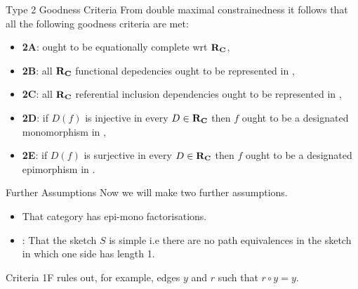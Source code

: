 \begin{frame}{Type 2 Goodness Criteria}{\slidecontext}
From double maximal constrainedness it follows that all the following goodness criteria are met: 
\begin{itemize}
\item \textbf{2A}:  \catcw ought to be equationally complete wrt $\textbf{R}_{\textbf{C}}$,         
\item \textbf{2B}:  all $\textbf{R}_{\textbf{C}}$ functional depedencies ought to be represented in \catc,
\item \textbf{2C}:  all $\textbf{R}_{\textbf{C}}$ referential inclusion dependencies ought to be represented in \catc, 
\pause \item \textbf{2D}:  if $D(f)$ is injective in every $D \in \textbf{R}_{\textbf{C}}$ then $f$ ought to be a designated monomorphism in \catc,
\pause \item \textbf{2E}:  if $D(f)$ is surjective in every $D \in \textbf{R}_{\textbf{C}}$ then $f$ ought to be a designated epimorphism in \catc.
\end{itemize}
\iffalse
We can also show that \textbf{2B} can be weakened. If all functional dependencies \textbf{upon edges} from sketch $S$ are represented then all functional dependencies are represented. \highlight{Too much information}
\fi
\end{frame}

\begin{frame}{Further Assumptions}
Now we will make two further assumptions.
\begin{itemize}
\item That category \catcw has epi-mono factorisations.
\item {}: That the sketch $S$ is simple i.e there are no path equivalences 
in the sketch in which one side has length 1. 
\end{itemize}
Criteria 1F rules out, for example, edges $y$ and $r$ such that $r \circ y = y$.
\end{frame}


